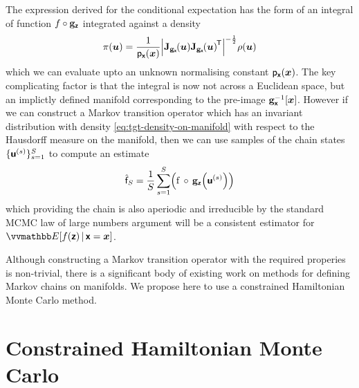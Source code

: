 The expression derived for the conditional expectation has the form of an integral of function $f \circ {\mathbf{g}}_{\boldsymbol{\mathsf{z}}}$ integrated against a density
\begin{equation}\label{eq:tgt-density-on-manifold}
    \pi(\vct{u}) =
    \frac{1}{\pden{\rvct{x}}(\vct{x})}
    \left|\jacob{\genfunc_{\rvct{x}}}{\vct{u}}\jacob{\genfunc_{\rvct{x}}}{\vct{u}}\tr\right|^{-\frac{1}{2}}
    \rho(\vct{u}) 
\end{equation}
which we can evaluate upto an unknown normalising constant $\mathsf{p}_{\boldsymbol{\mathsf{x}}}(\boldsymbol{x})$. The key complicating factor is that the integral is now not across a Euclidean space, but an implictly defined manifold corresponding to the pre-image ${\mathbf{g}}_{\boldsymbol{\mathsf{x}}}^{-1}[\boldsymbol{x}]$. However if we can construct a Markov transition operator which has an invariant distribution with density \eqref{eq:tgt-density-on-manifold} with respect to the Hausdorff measure on the manifold, then we can use samples of the chain states $\lbrace\boldsymbol{\mathsf{u}}^{(s)}\rbrace_{s=1}^S$ to compute an estimate
\begin{equation}\label{eq:mc-est-cond-expc}
    \hat{\rvar{f}}_S =
    \frac{1}{S} 
    \sum_{s=1}^S \lpa
      \func{f}\,\circ\,\genfunc_{\rvct{z}}\lpa\rvct{u}^{(s)}\rpa
    \rpa
\end{equation}
which providing the chain is also aperiodic and irreducible by the standard \ac{MCMC} law of large numbers argument will be a consistent estimator for $\expc{f(\rvct{z}) \gvn \rvct{x} = \vct{x}}$. 


Although constructing a Markov transition operator with the required properies is non-trivial, there is a significant body of existing work on methods for defining Markov chains on manifolds. We propose here to use a constrained Hamiltonian Monte Carlo method.

\section{Constrained Hamiltonian Monte Carlo}\label{sec:chmc}

